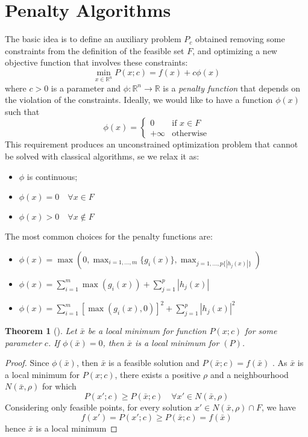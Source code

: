 \documentclass{book}
\newcommand{\R}{\mathbb{R}}
\theoremstyle{theoremv2}
\newtheorem{theorem}{Theorem}[chapter]
\theoremstyle{defv2}
\theoremstyle{remark}
\theoremstyle{remark}
\begin{document}
\section{Penalty Algorithms}
The basic idea is to define an auxiliary problem $P_c$ obtained removing some constraints from the definition of the feasible set $F$, and optimizing a new objective function that involves these constraints:
\[
    \min_{x\in\R^n}P(x;c)=f(x)+c\phi(x)
\]
where $c>0$ is a parameter and $\phi:\R^n\to\R$ is a \emph{penalty function} that depends on the violation of the constraints. Ideally, we would like to have a function $\phi(x)$ such that 
\[
    \phi(x) = \begin{cases}
        0 & \text{if } x\in F\\
        +\infty & \text{otherwise}
    \end{cases}
\]
This requirement produces an unconstrained optimization problem that cannot be solved with classical algorithms, se we relax it as:
\begin{itemize}
    \item $\phi$ is continuous;
        \item $\phi(x)=0\quad\forall x\in F$
        \item $\phi(x)>0\quad\forall x\notin F$
\end{itemize}
The most common choices for the penalty functions are:
\begin{itemize}
    \item $\phi(x)=\max(0,\max_{i=1,\dots,m}\{g_i(x)\},\max_{j=1,\dots,p\{|h_j(x)|\}})$
    \item $\phi(x)=\sum_{i=1}^{m}\max(g_i(x))+\sum_{j=1}^{p}|h_j(x)|$
    \item $\phi(x)=\sum_{i=1}^{m}[\max(g_i(x),0)]^2+\sum_{j=1}^{p}|h_j(x)|^2$
\end{itemize}
\begin{theorem}[]
    Let $\bar{x}$ be a local minimum for function $P(x;c)$ for some parameter $c$. If $\phi(\bar{x})=0$, then $\bar{x}$ is a local minimum for $(P)$.
\end{theorem}
\begin{proof}
    Since $\phi(\bar{x})$, then $\bar{x}$ is a feasible solution and $P(\bar{x};c)=f(\bar{x})$ . As $\bar{x}$ is a local minimum for $P(x;c)$, there exists a positive $\rho$ and a neighbourhood $N(\bar{x},\rho)$ for which 
    \[
        P(x';c)\geq P(\bar{x};c) \quad \forall x'\in N(\bar{x},\rho)
    \]
    Considering only feasible points, for every solution $x'\in N(\bar{x},\rho)\cap F$, we have
    \[
        f(x')=P(x';c)\geq P(\bar{x};c)=f(\bar{x})
    \]
    hence $\bar{x}$ is a local minimum
\end{proof}
\end{document}
